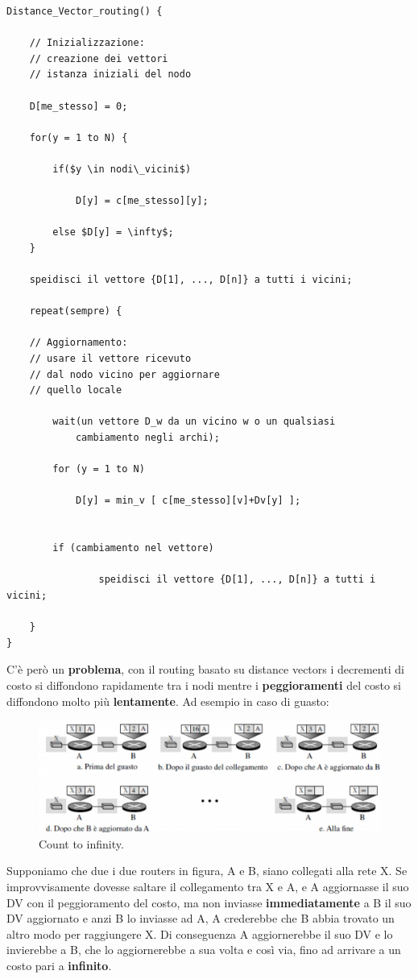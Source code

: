 \documentclass[11pt,a4paper,oneside]{book}
\theoremstyle{definition}
\begin{document}
\begin{lstlisting}
Distance_Vector_routing() {
	
	// Inizializzazione: 
	// creazione dei vettori 
	// istanza iniziali del nodo
	
	D[me_stesso] = 0;
	
	for(y = 1 to N) {
		
		if($y \in nodi\_vicini$) 
			
			D[y] = c[me_stesso][y];
			
		else $D[y] = \infty$;
	}
	
	speidisci il vettore {D[1], ..., D[n]} a tutti i vicini;
	
	repeat(sempre) {
	
	// Aggiornamento:
	// usare il vettore ricevuto 
	// dal nodo vicino per aggiornare
	// quello locale
	
		wait(un vettore D_w da un vicino w o un qualsiasi 
			cambiamento negli archi);
			
		for (y = 1 to N) 
			
			D[y] = min_v [ c[me_stesso][v]+Dv[y] ];
		
		
		if (cambiamento nel vettore) 
			
				speidisci il vettore {D[1], ..., D[n]} a tutti i vicini;
	
	}
}
\end{lstlisting}

\pagebreak

C'è però un \textbf{problema}, con il routing basato su distance vectors i decrementi di costo si diffondono rapidamente tra i nodi mentre i \textbf{peggioramenti} del costo si diffondono molto più \textbf{lentamente}. Ad esempio in caso di guasto:

\begin{figure}[!h]
	\centering
	\includegraphics[scale=0.32]{Immagini/C2i.png}
	\caption{Count to infinity.}
\end{figure}

Supponiamo che due i due routers in figura, A e B, siano collegati alla rete X. Se improvvisamente dovesse saltare il collegamento tra X e A, e A aggiornasse il suo DV con il peggioramento del costo, ma non inviasse \textbf{immediatamente} a B il suo DV aggiornato e anzi B lo inviasse ad A, A crederebbe che B abbia trovato un altro modo per raggiungere X. Di conseguenza A aggiornerebbe il suo DV e lo invierebbe a B, che lo aggiornerebbe a sua volta e così via, fino ad arrivare a un costo pari a \textbf{infinito}.
\end{document}
